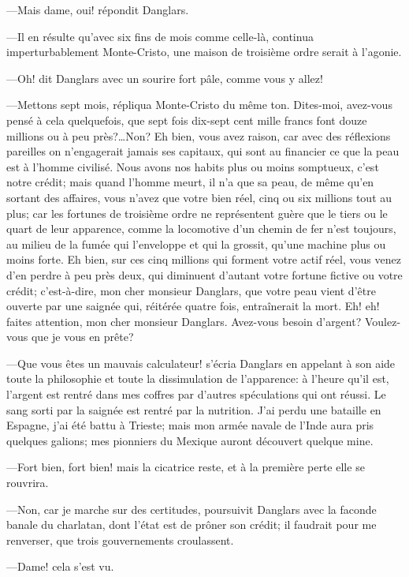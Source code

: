 —Mais dame, oui! répondit Danglars. 

—Il en résulte qu'avec six fins de mois comme celle-là, continua imperturbablement Monte-Cristo, une maison de troisième ordre serait à l'agonie. 

—Oh! dit Danglars avec un sourire fort pâle, comme vous y allez! 

—Mettons sept mois, répliqua Monte-Cristo du même ton. Dites-moi, avez-vous pensé à cela quelquefois, que sept fois dix-sept cent mille francs font douze millions ou à peu près?\dots Non? Eh bien, vous avez raison, car avec des réflexions pareilles on n'engagerait jamais ses capitaux, qui sont au financier ce que la peau est à l'homme civilisé. Nous avons nos habits plus ou moins somptueux, c'est notre crédit; mais quand l'homme meurt, il n'a que sa peau, de même qu'en sortant des affaires, vous n'avez que votre bien réel, cinq ou six millions tout au plus; car les fortunes de troisième ordre ne représentent guère que le tiers ou le quart de leur apparence, comme la locomotive d'un chemin de fer n'est toujours, au milieu de la fumée qui l'enveloppe et qui la grossit, qu'une machine plus ou moins forte. Eh bien, sur ces cinq millions qui forment votre actif réel, vous venez d'en perdre à peu près deux, qui diminuent d'autant votre fortune fictive ou votre crédit; c'est-à-dire, mon cher monsieur Danglars, que votre peau vient d'être ouverte par une saignée qui, réitérée quatre fois, entraînerait la mort. Eh! eh! faites attention, mon cher monsieur Danglars. Avez-vous besoin d'argent? Voulez-vous que je vous en prête? 

—Que vous êtes un mauvais calculateur! s'écria Danglars en appelant à son aide toute la philosophie et toute la dissimulation de l'apparence: à l'heure qu'il est, l'argent est rentré dans mes coffres par d'autres spéculations qui ont réussi. Le sang sorti par la saignée est rentré par la nutrition. J'ai perdu une bataille en Espagne, j'ai été battu à Trieste; mais mon armée navale de l'Inde aura pris quelques galions; mes pionniers du Mexique auront découvert quelque mine. 

—Fort bien, fort bien! mais la cicatrice reste, et à la première perte elle se rouvrira. 

—Non, car je marche sur des certitudes, poursuivit Danglars avec la faconde banale du charlatan, dont l'état est de prôner son crédit; il faudrait pour me renverser, que trois gouvernements croulassent. 

—Dame! cela s'est vu. 

